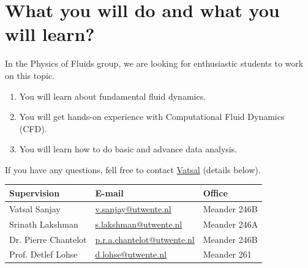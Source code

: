 \documentclass[a4paper,10pt]{article}
\begin{document}
\section*{What you will do and what you will learn?}
In the Physics of Fluids group, we are looking for enthusiastic students to work on this topic.
\begin{enumerate}
\itemsep0em
\item You will learn about fundamental fluid dynamics.
\item You will get hands-on experience with Computational Fluid Dynamics (CFD).
\item You will learn how to do basic and advance data analysis.
\end{enumerate}
If you have any questions, fell free to contact \href{mailto:v.sanjay@utwente.nl}{Vatsal} (details below).
\begin{center}
\begin{tabular}{|l|l|l|}
\hline \textbf{Supervision} & \textbf{E-mail} & \textbf{Office} \\
\hline Vatsal Sanjay & \href{mailto:v.sanjay@utwente.nl}{v.sanjay@utwente.nl} & Meander 246B \\
\hline Srinath Lakshman   & \href{mailto:s.lakshman@utwente.nl}{s.lakshman@utwente.nl}& Meander 246A \\
\hline Dr. Pierre Chantelot   & \href{mailto:p.r.a.chantelot@utwente.nl}{p.r.a.chantelot@utwente.nl}& Meander 246B \\
\hline Prof. Detlef Lohse & \href{mailto:d.lohse@utwente.nl}{d.lohse@utwente.nl} & Meander 261  \\
\hline
\end{tabular}
\end{center}
\printbibliography
\end{document}
